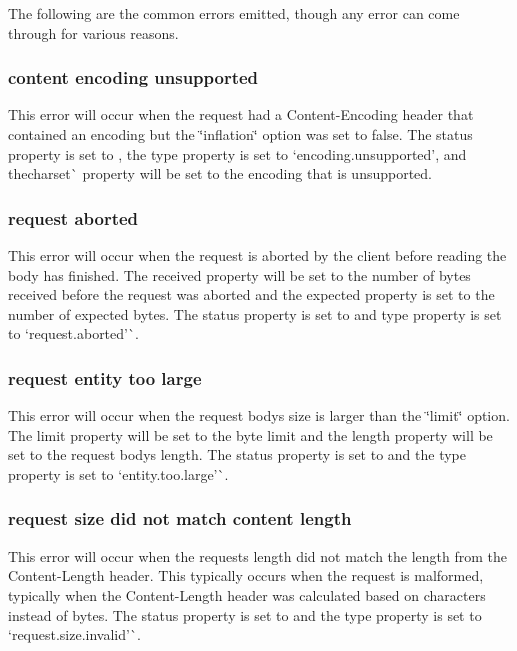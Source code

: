 The following are the common errors emitted, though any error can come through for various reasons.

\subsubsection*{content encoding unsupported}

This error will occur when the request had a {\ttfamily Content-\/\+Encoding} header that contained an encoding but the \char`\"{}inflation\char`\"{} option was set to {\ttfamily false}. The {\ttfamily status} property is set to {}, the {\ttfamily type} property is set to `\textquotesingle{}encoding.\+unsupported'{\ttfamily , and the}charset\`{} property will be set to the encoding that is unsupported.

\subsubsection*{request aborted}

This error will occur when the request is aborted by the client before reading the body has finished. The {\ttfamily received} property will be set to the number of bytes received before the request was aborted and the {\ttfamily expected} property is set to the number of expected bytes. The {\ttfamily status} property is set to {} and {\ttfamily type} property is set to `\textquotesingle{}request.\+aborted'\`{}.

\subsubsection*{request entity too large}

This error will occur when the request body\textquotesingle{}s size is larger than the \char`\"{}limit\char`\"{} option. The {\ttfamily limit} property will be set to the byte limit and the {\ttfamily length} property will be set to the request body\textquotesingle{}s length. The {\ttfamily status} property is set to {} and the {\ttfamily type} property is set to `\textquotesingle{}entity.\+too.\+large'\`{}.

\subsubsection*{request size did not match content length}

This error will occur when the request\textquotesingle{}s length did not match the length from the {\ttfamily Content-\/\+Length} header. This typically occurs when the request is malformed, typically when the {\ttfamily Content-\/\+Length} header was calculated based on characters instead of bytes. The {\ttfamily status} property is set to {} and the {\ttfamily type} property is set to `\textquotesingle{}request.\+size.\+invalid'\`{}.

